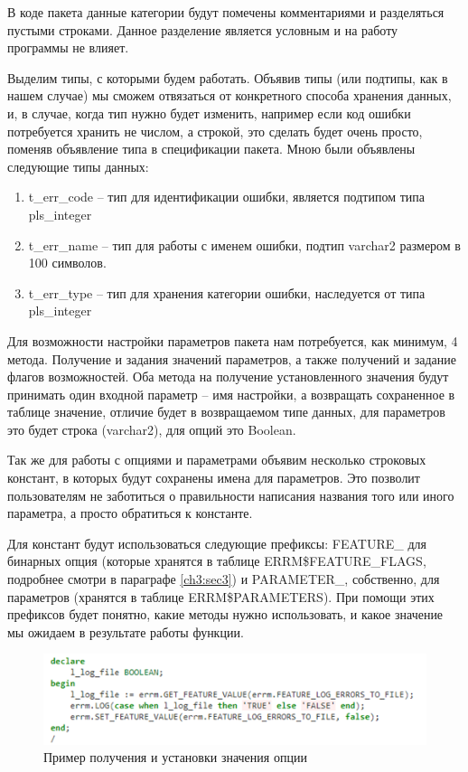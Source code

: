 В коде пакета данные категории будут помечены комментариями и разделяться пустыми строками. Данное разделение является условным и на работу программы не влияет. 

Выделим типы, с которыми будем работать. Объявив типы (или подтипы, как в нашем случае) мы сможем отвязаться от конкретного способа хранения данных, и, в случае, когда тип нужно будет изменить, например если код ошибки потребуется хранить не числом, а строкой, это сделать будет очень просто, поменяв объявление типа в спецификации пакета. Мною были объявлены следующие типы данных:

\begin{enumerate} 
\item t\_err\_code – тип для идентификации ошибки, является подтипом типа pls\_integer 
\item t\_err\_name – тип для работы с именем ошибки, подтип varchar2 размером в 100 символов.
\item t\_err\_type – тип для хранения категории ошибки, наследуется от типа pls\_integer
\end{enumerate} 

Для возможности настройки параметров пакета нам потребуется, как минимум, 4 метода. Получение и задания значений параметров, а также получений и задание флагов возможностей. Оба метода на получение установленного значения будут принимать один входной параметр – имя настройки, а возвращать сохраненное в таблице значение, отличие будет в возвращаемом типе данных, для параметров это будет строка (varchar2), для опций это Boolean. 

Так же для работы с опциями и параметрами объявим несколько строковых констант, в которых будут сохранены имена для параметров. Это позволит пользователям не заботиться о правильности написания названия того или иного параметра, а просто обратиться к константе. 

Для констант будут использоваться следующие префиксы: FEATURE\_ для бинарных опция (которые хранятся в таблице ERRM\$FEATURE\_FLAGS, подробнее смотри в параграфе \ref{ch3:sec3}) и PARAMETER\_, собственно, для параметров (хранятся в таблице ERRM\$PARAMETERS). При помощи этих префиксов будет понятно, какие методы нужно использовать, и какое значение мы ожидаем в результате работы функции. 

\begin{figure}[ht!] 
	\center
	\includegraphics [scale=1] {my_folder/img/C3_get_feature.png}
	\caption{Пример получения и установки значения опции} 
	\label{fig:C3_get_feature}  
\end{figure}
\FloatBarrier

